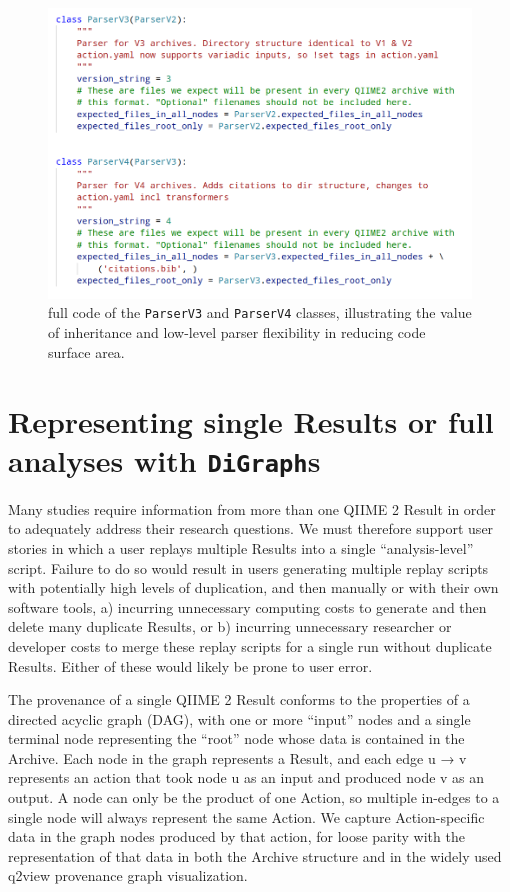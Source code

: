 \begin{figure}[htp]
\centering
\includegraphics[width=\textwidth]{figures/parserCodeBlock.png}
\caption[Code snippet illustrating the value of inheritance to ArchiveParser Versions]%
{full code of the \texttt{ParserV3} and \texttt{ParserV4} classes, illustrating the value of
inheritance and low-level parser flexibility in reducing code surface area.}
\label{fig:parserCodeBlock}
\end{figure}


\section{Representing single Results or full analyses with \texttt{DiGraph}s}

Many studies require information from more than one QIIME 2 Result in order to
adequately address their research questions. We must therefore support user
stories in which a user replays multiple Results into a single “analysis-level”
script. Failure to do so would result in users generating multiple replay
scripts with potentially high levels of duplication, and then manually or with
their own software tools, a) incurring unnecessary computing costs to generate
and then delete many duplicate Results, or b) incurring unnecessary researcher
or developer costs to merge these replay scripts for a single run without
duplicate Results. Either of these would likely be prone to user error. 

The provenance of a single QIIME 2 Result conforms to the properties of a
directed acyclic graph (DAG), with one or more “input” nodes and a single
terminal node representing the “root” node whose data is contained in the
Archive. Each node in the graph represents a Result, and each edge u → v
represents an action that took node u as an input and produced node v as an
output. A node can only be the product of one Action, so multiple in-edges to a
single node will always represent the same Action. We capture Action-specific
data in the graph nodes produced by that action, for loose parity with the
representation of that data in both the Archive structure and in the widely used
q2view provenance graph visualization. 


